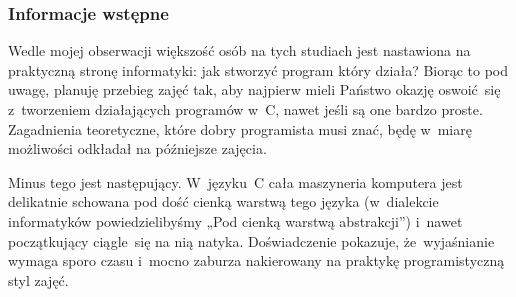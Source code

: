 \documentclass[10pt,t]{beamer}
\begin{document}
\begin{frame}
  \frametitle{Informacje wstępne}


  Wedle mojej obserwacji większość osób na tych studiach jest nastawiona
  na praktyczną stronę informatyki: jak stworzyć program który działa?
  Biorąc to pod uwagę, planuję przebieg zajęć tak, aby najpierw mieli
  Państwo okazję oswoić~się z~tworzeniem działających programów
  w~C, nawet jeśli są one bardzo proste. Zagadnienia teoretyczne, które
  dobry programista musi znać, będę w~miarę możliwości odkładał
  na późniejsze zajęcia.

  Minus tego jest następujący. W~języku~C cała maszyneria komputera jest
  delikatnie schowana pod dość cienką warstwą tego języka (w~dialekcie
  informatyków powiedzielibyśmy „Pod cienką warstwą abstrakcji”)
  i~nawet początkujący ciągle~się na nią natyka. Doświadczenie pokazuje,
  że~wyjaśnianie wymaga sporo czasu i~mocno zaburza nakierowany na praktykę
  programistyczną styl zajęć.
\end{frame}
\end{document}
